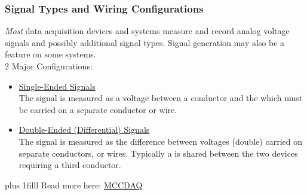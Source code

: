 \documentclass[fleqn]{beamer} %
\newcommand{\sectionIIsubsectionItitle}{Signal Types and Wiring Configurations}
\newcommand{\btVFill}{\vskip0pt plus 1filll}
\begin{document}
		    \begin{frame}[label=sectionIIsubsectionI]
				\frametitle{\sectionIIsubsectionItitle} \scriptsize

				{\it Most} data acquisition devices and systems measure and record {\BL analog} voltage signals and possibly additional signal types. Signal {\GR generation} may also be a feature on some systems. \vspace{5mm}\\

					2 Major Configurations:
					\begin{itemize}
						\item
						\underline{Single-Ended Signals} \vspace{0mm}\\
						The signal is measured as a voltage between a \underline{\hspace{20mm}} conductor and the \underline{\hspace{20mm}} which must be carried on a separate conductor or wire. \vspace{10mm}\\
					
						\item
						\underline{Double-Ended (Differential) Signals} \vspace{0mm}\\			
						The signal is measured as the {\PN difference} between \underline{\hspace{20mm}} voltages ({\PN double}) carried on separate conductors, or wires. Typically a \underline{\hspace{20mm}} is shared between the two devices requiring a third conductor. 
					\end{itemize}
				
					\btVFill
					\tiny{Read more here: \href{https://www.mccdaq.com/TechTips/TechTip-4.aspx}{MCCDAQ}}

			\end{frame}	
\end{document}
